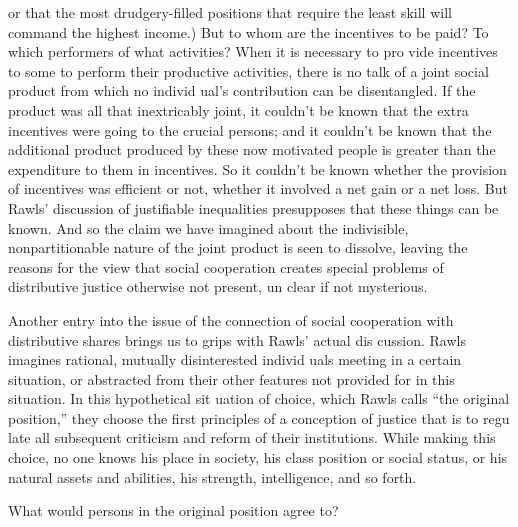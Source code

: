 \documentclass[11pt,openany]{book}
\begin{document}
or that the most drudgery-filled positions that require the least skill will command the highest income.) But to whom are the incentives to be paid? To which performers of what activities? When it is necessary to pro vide incentives to some to perform their productive activities, there is no talk of a joint social product from which no individ ual's contribution can be disentangled. If the product was all that inextricably joint, it couldn't be known that the extra incentives were going to the crucial persons; and it couldn't be known that the additional product produced by these now motivated people is greater than the expenditure to them in incentives. So it couldn't be known whether the provision of incentives was efficient or not, whether it involved a net gain or a net loss. But Rawls' discussion of justifiable inequalities presupposes that these things can be known. And so the claim we have imagined about the indivisible, nonpartitionable nature of the joint product is seen to dissolve, leaving the reasons for the view that social cooperation creates special problems of distributive justice otherwise not present, un clear if not mysterious. 

Another entry into the issue of the connection of social cooperation with distributive shares brings us to grips with Rawls' actual dis cussion. Rawls imagines rational, mutually disinterested individ uals meeting in a certain situation, or abstracted from their other features not provided for in this situation. In this hypothetical sit uation of choice, which Rawls calls ``the original position,'' they choose the first principles of a conception of justice that is to regu late all subsequent criticism and reform of their institutions. While making this choice, no one knows his place in society, his class position or social status, or his natural assets and abilities, his strength, intelligence, and so forth. 

What would persons in the original position agree to? 
\end{document}
